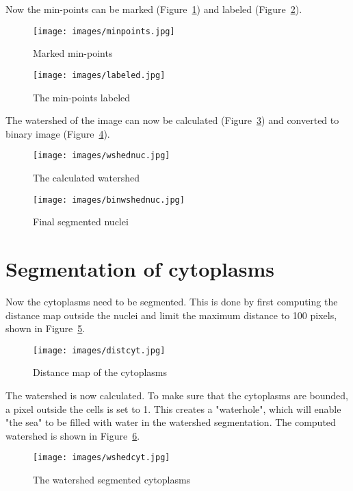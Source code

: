 \documentclass[twocolumn]{article}
\begin{document}
Now the min-points can be marked (Figure~\ref{fig:minpoints}) and labeled
(Figure~\ref{fig:labeled}).

\begin{figure}[h!]
    \centering
    \texttt{[image: images/minpoints.jpg]}
    \caption{Marked min-points}
    \label{fig:minpoints}
\end{figure}

\begin{figure}[h!]
    \centering
    \texttt{[image: images/labeled.jpg]}
    \caption{The min-points labeled}
    \label{fig:labeled}
\end{figure}

The watershed of the image can now be calculated (Figure~\ref{fig:wshednuc}) 
and converted to binary image (Figure~\ref{fig:binwshednuc}).

\begin{figure}[h!]
    \centering
    \texttt{[image: images/wshednuc.jpg]}
    \caption{The calculated watershed}
    \label{fig:wshednuc}
\end{figure}

\begin{figure}[h!]
    \centering
    \texttt{[image: images/binwshednuc.jpg]}
    \caption{Final segmented nuclei}
    \label{fig:binwshednuc}
\end{figure}

\section{Segmentation of cytoplasms}

Now the cytoplasms need to be segmented. This is done by first computing the distance
map outside the nuclei and limit the maximum distance to 100 pixels, shown in
Figure~\ref{fig:distcyt}.

\begin{figure}[h!]
    \centering
    \texttt{[image: images/distcyt.jpg]}
    \caption{Distance map of the cytoplasms}
    \label{fig:distcyt}
\end{figure}

The watershed is now calculated. To make sure that the cytoplasms are bounded,
a pixel outside the cells is set to 1. This creates a "waterhole", which will
enable "the sea" to be filled with water in the watershed segmentation. The
computed watershed is shown in Figure~\ref{fig:wshedcyt}.

\begin{figure}[h!]
    \centering
    \texttt{[image: images/wshedcyt.jpg]}
    \caption{The watershed segmented cytoplasms}
    \label{fig:wshedcyt}
\end{figure}
\end{document}
